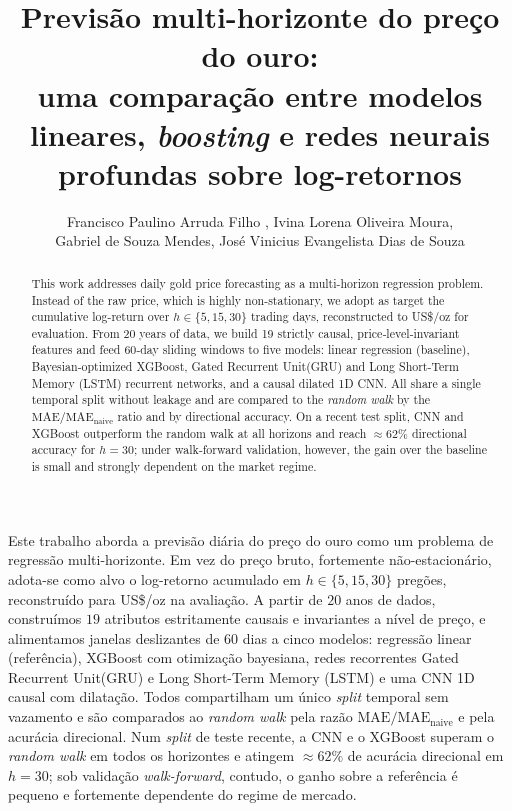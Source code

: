 \documentclass[12pt]{article}
\title{Previsão multi-horizonte do preço do ouro:\\
       uma comparação entre modelos lineares, \emph{boosting} e redes
       neurais profundas sobre log-retornos}
\author{Francisco Paulino Arruda Filho \inst{1}, Ivina Lorena Oliveira Moura\inst{1},\\ Gabriel de Souza Mendes\inst{1}, José Vinicius Evangelista Dias de Souza\inst{1}}
\begin{document}
\maketitle

\begin{abstract}
This work addresses daily gold price forecasting as a multi-horizon regression problem.
Instead of the raw price, which is highly non-stationary, we adopt as target the
cumulative log-return over $h\!\in\!\{5,15,30\}$ trading days, reconstructed to
US\$/oz for evaluation. From 20 years of data, we build 19 strictly causal,
price‑level‑invariant features and feed 60‑day sliding windows to five models:
linear regression (baseline), Bayesian‑optimized XGBoost, Gated Recurrent Unit(GRU) and Long Short-Term Memory (LSTM) recurrent
networks, and a causal dilated 1D CNN. All share a single temporal split without
leakage and are compared to the \emph{random walk} by the
$\mathrm{MAE}/\mathrm{MAE}_{\text{naive}}$ ratio and by directional accuracy. On a
recent test split, CNN and XGBoost outperform the random walk at all horizons and
reach $\approx\!62\%$ directional accuracy for $h\!=\!30$; under walk‑forward
validation, however, the gain over the baseline is small and strongly dependent on
the market regime.
\end{abstract}

\begin{resumo}
  Este trabalho aborda a previsão diária do preço do ouro como um problema de
  regressão multi-horizonte. Em vez do preço bruto, fortemente
  não-estacionário, adota-se como alvo o log-retorno acumulado em
  $h\!\in\!\{5,15,30\}$ pregões, reconstruído para US\$/oz na avaliação. A
  partir de $20$ anos de dados, construímos $19$ atributos estritamente
  causais e invariantes a nível de preço, e alimentamos janelas deslizantes de
  $60$ dias a cinco modelos: regressão linear (referência), XGBoost com
  otimização bayesiana, redes recorrentes Gated Recurrent Unit(GRU) e Long Short-Term Memory (LSTM) e uma CNN 1D causal com
  dilatação. Todos compartilham um único \emph{split} temporal sem vazamento e
  são comparados ao \emph{random walk} pela razão
  $\mathrm{MAE}/\mathrm{MAE}_{\text{naive}}$ e pela acurácia direcional. Num
  \emph{split} de teste recente, a CNN e o XGBoost superam o \emph{random walk}
  em todos os horizontes e atingem $\approx\!62\%$ de acurácia direcional em
  $h\!=\!30$; sob validação \emph{walk-forward}, contudo, o ganho sobre a
  referência é pequeno e fortemente dependente do regime de mercado.
\end{resumo}
\end{document}
